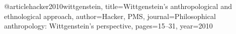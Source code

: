 @article{hacker2010wittgenstein,
  title={Wittgenstein’s anthropological and ethnological approach},
  author={Hacker, PMS},
  journal={Philosophical anthropology: Wittgenstein’s perspective},
  pages={15--31},
  year={2010}
}
